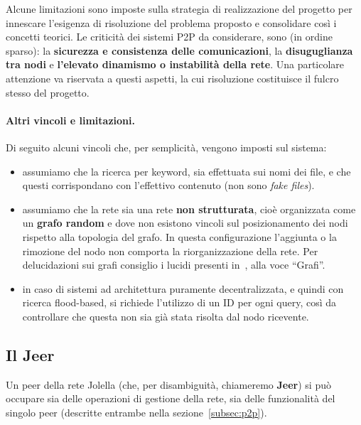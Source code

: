 Alcune limitazioni sono imposte sulla strategia di realizzazione del progetto
per innescare l'esigenza di risoluzione del problema proposto e consolidare così
i concetti teorici. Le criticità dei sistemi P2P da considerare, sono (in ordine
sparso): la \textbf{sicurezza e consistenza delle comunicazioni}, la
\textbf{disuguglianza tra nodi} e \textbf{l'elevato dinamismo o instabilità
 della rete}. Una particolare attenzione va riservata a questi aspetti, la cui
risoluzione costituisce il fulcro stesso del progetto.

\paragraph{Altri vincoli e limitazioni.} Di seguito alcuni vincoli che, per
semplicità, vengono imposti sul sistema:

\begin{itemize}

 \item assumiamo che la ricerca per keyword, sia effettuata sui
       nomi dei file, e che questi corrispondano con l'effettivo contenuto
       (non sono \textit{fake files}).

 \item assumiamo che la rete sia una rete \textbf{non strutturata}, cioè
       organizzata come un \textbf{grafo random} e dove non esistono vincoli sul
       posizionamento dei nodi rispetto alla topologia del grafo. In questa
       configurazione l'aggiunta o la rimozione del nodo non comporta la
       riorganizzazione della rete. Per delucidazioni sui grafi consiglio i lucidi presenti in~\cite{grafi}, alla voce ``Grafi''.

 \item in caso di sistemi ad architettura puramente decentralizzata, e quindi
       con ricerca flood-based, si richiede l'utilizzo di un  ID per ogni query, così
       da controllare che questa non sia già stata risolta dal nodo  ricevente.

\end{itemize}

\subsection{Il Jeer}
\label{subsec:jeer}

Un peer della rete Jolella (che, per disambiguità, chiameremo \textbf{Jeer}) si
può occupare sia delle operazioni di gestione della rete, sia delle funzionalità
del singolo peer (descritte entrambe nella sezione~\ref{subsec:p2p}).

